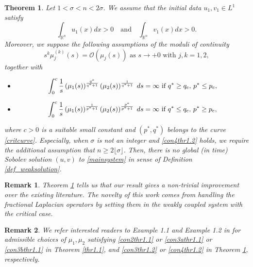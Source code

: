 \documentclass[11pt,reqno]{amsart}
\newcommand{\di}{\displaystyle}
\newcommand{\tron}[1]{\left( #1 \right)}
\numberwithin{equation}{section}
\newtheorem{theorem}{Theorem}[section]
\newtheorem{remark}{Remark}[section]
\newcommand{\flo}[1]{\lfloor #1 \rfloor }
\begin{document}
\begin{theorem}\label{thr1.2}
    Let $1<\sigma<n<2\sigma$. We assume that the initial data $u_1,v_1\in L^1 $ satisfy
    \begin{equation}\label{con1thr1.2}
        \int_{\mathbb{R}^n}u_1(x)dx>0\quad \text{and}\quad \int_{\mathbb{R}^n}v_1(x)dx>0.
    \end{equation}
    Moreover, we suppose the following assumptions of the moduli of continuity
    \begin{equation}\label{con2thr1.2}
        s^{k}\mu^{(k)}_{j}(s)=\mathcal{O}(\mu_j(s))\text{ as }s\to +0\text{ with }j,k=1,2,
    \end{equation}
    together with
    \begin{itemize}
         \item[\rm i)] 
     \begin{equation}\label{con3thr1.2}
            \di\int_{0}^c\frac{1}{s}\tron{\mu_1(s)}^{\frac{q^*}{q^*+1}}\tron{\mu_2(s)}^{\frac{1}{q^*+1}}\;ds=\infty \text{ if }q^*\geq q_{\rm c},\, p^*\leq p_{\rm c},
            \end{equation}
         \item[\rm ii)]     
            \begin{equation}\label{con4thr1.2}
            \di\int_{0}^c\frac{1}{s}\tron{\mu_1(s)}^{\frac{1}{p^*+1}}\tron{\mu_2(s)}^{\frac{p^*}{p^*+1}}\;ds=\infty\text{ if }q^*\leq q_{\rm c},\, p^*\geq p_{\rm c},
            \end{equation}
    \end{itemize}
    where $c>0$ is a suitable small constant and $(p^*,q^*)$ belongs to the curve \eqref{critcurve}. Especially, when $\sigma$ is not an integer and \eqref{con4thr1.2} holds, we require the additional assumption that $n\geq 2\flo{\sigma}$. Then, there is no global (in time) Sobolev solution $(u,v)$ to \eqref{mainsystem} in sense of Definition \ref{def_weaksolution}.
\end{theorem}
\begin{remark}
{\rm
Theorem \ref{thr1.2} tells us that our result gives a non-trivial improvement over the existing literature. The novelty of this work comes from handling the fractional Laplacian operators by setting them in the weakly coupled system with the critical case.
}
\end{remark}
\begin{remark}
\rm{
    We refer interested readers to Example 1.1 and Example 1.2 in \cite{AnhRei2021} for admissible choices of $\mu_1, \mu_2$ satisfying \eqref{con2thr1.1} or \eqref{con3athr1.1} or \eqref{con3bthr1.1} in Theorem \ref{thr1.1}, and \eqref{con3thr1.2} or \eqref{con4thr1.2} in Theorem \ref{thr1.2}, respectively. 
}
\end{remark}
\end{document}
